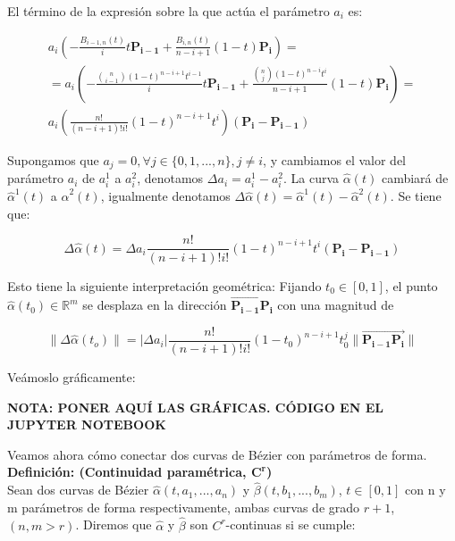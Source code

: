 \documentclass{article}
\newcommand{\R}{\mathbb{R}}
\begin{document}
El término de la expresión sobre la que actúa el parámetro $a_i$ es:

\begin{gather*}
a_i \left( -\frac{B_{i-1,n}(t)}{i} t \mathbf{P_{i-1}} + \frac{B_{i,n}(t)}{n-i+1} (1-t) \mathbf{P_i} \right) = \\
= a_i \left( -\frac{\binom{n}{i-1}(1-t)^{n-i+1} t^{i-1}}{i} t \mathbf{P_{i-1}} + \frac{\binom{n}{j}(1-t)^{n-i}t^i}{n-i+1} (1-t) \mathbf{P_i} \right) = \\
a_i \left( \frac{n!}{(n-i+1)!i!} (1-t)^{n-i+1} t^i  \right) \left( \mathbf{P_i} - \mathbf{P_{i-1}} \right)
\end{gather*}

Supongamos que $a_j = 0, \forall j\in\{0,1,...,n\}, j \neq i $, y cambiamos el valor del parámetro $a_i$ de $a_i^1$ a $a_i^2$, denotamos $\Delta a_i = a_i^1 - a_i^2$. La curva $\hat{\alpha}(t)$ cambiará de $\hat{\alpha}^1(t)$ a $\hat{\alpha}^2(t)$, igualmente denotamos $\Delta \hat{\alpha}(t) = \hat{\alpha}^1(t) - \hat{\alpha}^2(t)$. Se tiene que:

\begin{equation*}
\Delta \hat{\alpha}(t) = \Delta a_i \frac{n!}{(n-i+1)!i!}(1-t)^{n-i+1}t^i \left( \mathbf{P_i} - \mathbf{P_{i-1}} \right)
\end{equation*}

Esto tiene la siguiente interpretación geométrica: Fijando $t_0 \in [0,1]$, el punto $\hat{\alpha}(t_0) \in \R^m$ se desplaza en la dirección $\overrightarrow{\mathbf{P_{i-1}P_i}}$ con una magnitud de

\begin{equation*}
\lVert \Delta\hat{\alpha}(t_o) \rVert =  | \Delta a_i | \frac{n!}{(n-i+1)!i!}(1-t_0)^{n-i+1}t_0^j \lVert \overrightarrow{\mathbf{P_{i-1}P_i}} \rVert
\end{equation*}

Veámoslo gráficamente:

\textbf{NOTA: PONER AQUÍ LAS GRÁFICAS. CÓDIGO EN EL JUPYTER NOTEBOOK}


Veamos ahora cómo conectar dos curvas de Bézier con parámetros de forma.\\

\textbf{Definición: (Continuidad paramétrica, $\mathbf{C^r}$)} \\

Sean dos curvas de Bézier $\hat{\alpha}(t,a_1,...,a_n)$ y $\hat{\beta}(t,b_1,...,b_m)$, $t\in[0,1]$ con n y m parámetros de forma respectivamente, ambas curvas de grado $r+1$, $(n,m > r)$. Diremos que $\hat{\alpha}$ y $\hat{\beta}$ son $C^r$-continuas si se cumple:
\end{document}

